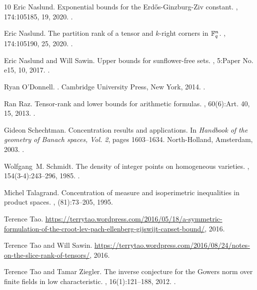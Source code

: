 \begin{thebibliography}{10}
Eric Naslund.
\newblock Exponential bounds for the {Erd\H{o}s}-{G}inzburg-{Z}iv constant.
, 174:105185, 19, 2020.
\newblock \href {https://doi.org/10.1016/j.jcta.2019.105185} {}.

Eric Naslund.
\newblock The partition rank of a tensor and {$k$}-right corners in {$\Bbb F_q^n$}.
, 174:105190, 25, 2020.
\newblock \href {https://doi.org/10.1016/j.jcta.2019.105190} {}.

Eric Naslund and Will Sawin.
\newblock Upper bounds for sunflower-free sets.
, 5:Paper No. e15, 10, 2017.
\newblock \href {https://doi.org/10.1017/fms.2017.12} {}.

Ryan O'Donnell.
.
\newblock Cambridge University Press, New York, 2014.
\newblock \href {https://doi.org/10.1017/CBO9781139814782} {}.

Ran Raz.
\newblock Tensor-rank and lower bounds for arithmetic formulas.
, 60(6):Art. 40, 15, 2013.
\newblock \href {https://doi.org/10.1145/2535928} {}.

Gideon Schechtman.
\newblock Concentration results and applications.
\newblock In {\em Handbook of the geometry of {B}anach spaces, {V}ol. 2}, pages 1603--1634. North-Holland, Amsterdam, 2003.
\newblock \href {https://doi.org/10.1016/S1874-5849(03)80044-X} {}.

Wolfgang~M. Schmidt.
\newblock The density of integer points on homogeneous varieties.
, 154(3-4):243--296, 1985.
\newblock \href {https://doi.org/10.1007/BF02392473} {}.

Michel Talagrand.
\newblock Concentration of measure and isoperimetric inequalities in product spaces.
, (81):73--205, 1995.

Terence Tao.
\newblock \url{https://terrytao.wordpress.com/2016/05/18/a-symmetric-formulation-of-the-croot-lev-pach-ellenberg-gijswijt-capset-bound/}, 2016.

Terence Tao and Will Sawin.
\newblock \url{https://terrytao.wordpress.com/2016/08/24/notes-on-the-slice-rank-of-tensors/}, 2016.

Terence Tao and Tamar Ziegler.
\newblock The inverse conjecture for the {G}owers norm over finite fields in low characteristic.
, 16(1):121--188, 2012.
\newblock \href {https://doi.org/10.1007/s00026-011-0124-3} {}.

\end{thebibliography}
